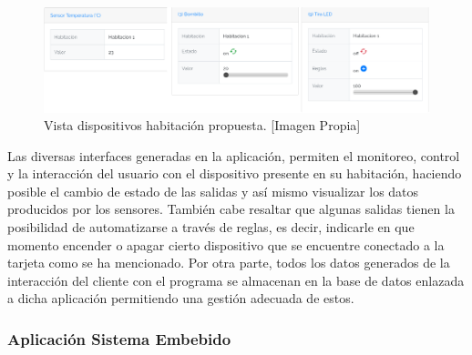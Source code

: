 \begin{figure}[!t]
	\centering
	\caption[Vista dispositivos habitación propuesta.]{Vista dispositivos habitación propuesta. [Imagen Propia]}
	\label{fig:r_app}
	\includegraphics[width=\linewidth]{Imagenes/R_app}
\end{figure}

%

Las diversas interfaces generadas en la aplicación, permiten el monitoreo, control y la interacción del usuario con el dispositivo presente en su habitación, haciendo posible el cambio de estado de las salidas y así mismo visualizar los datos producidos por los sensores. También cabe resaltar que algunas salidas tienen la posibilidad de automatizarse a través de reglas, es decir, indicarle en que momento encender o apagar cierto dispositivo que se encuentre conectado a la tarjeta como se ha mencionado. Por otra parte, todos los datos generados de la interacción del cliente con el programa se almacenan en la base de datos enlazada a dicha aplicación permitiendo una gestión adecuada de estos. \\

\subsubsection{Aplicación Sistema Embebido} 

